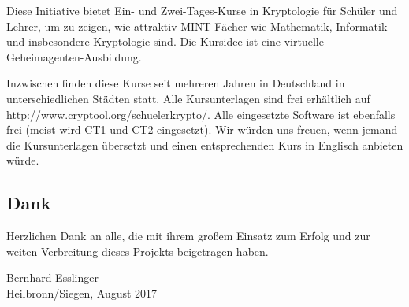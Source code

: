 Diese Initiative bietet Ein- und Zwei-Tages-Kurse in Kryptologie für Schüler und Lehrer, um zu zeigen, wie attraktiv MINT-Fächer wie Mathematik, Informatik und insbesondere Kryptologie sind. Die Kursidee ist eine virtuelle Geheimagenten-Ausbildung. 

Inzwischen finden diese Kurse seit mehreren Jahren in Deutschland in unterschiedlichen Städten statt.
Alle Kursunterlagen sind frei erhältlich auf \url{http://www.cryptool.org/schuelerkrypto/}. Alle eingesetzte Software ist ebenfalls frei (meist wird CT1 und CT2 eingesetzt). Wir würden uns freuen, wenn jemand die Kursunterlagen übersetzt und
einen entsprechenden Kurs in Englisch anbieten würde.

\subsection*{Dank}

Herzlichen Dank an alle, die mit ihrem großem Einsatz zum Erfolg und zur weiten Verbreitung dieses Projekts beigetragen haben.

\vspace*{3em}
Bernhard Esslinger \\ Heilbronn/Siegen, August 2017

